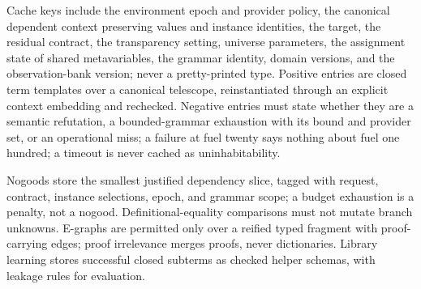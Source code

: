 Cache keys include the environment epoch and provider policy, the canonical dependent context preserving  values and instance identities, the target, the residual contract, the transparency setting, universe parameters, the assignment state of shared metavariables, the grammar identity, domain versions, and the observation-bank version; never a pretty-printed type. Positive entries are closed term templates over a canonical telescope, reinstantiated through an explicit context embedding and rechecked. Negative entries must state whether they are a semantic refutation, a bounded-grammar exhaustion with its bound and provider set, or an operational miss; a failure at fuel twenty says nothing about fuel one hundred; a timeout is never cached as uninhabitability.

Nogoods store the smallest justified dependency slice, tagged with request, contract, instance selections, epoch, and grammar scope; a budget exhaustion is a penalty, not a nogood. Definitional-equality comparisons must not mutate branch unknowns. E-graphs are permitted only over a reified typed fragment with proof-carrying edges; proof irrelevance merges proofs, never dictionaries. Library learning stores successful closed subterms as checked helper schemas, with leakage rules for evaluation.
